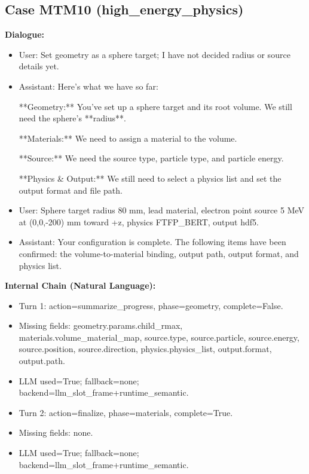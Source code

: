 \documentclass[11pt]{ctexart}
\begin{document}
\subsection{Case MTM10 (high\_energy\_physics)}
\textbf{Dialogue:}
\begin{itemize}
\item User: Set geometry as a sphere target; I have not decided radius or source details yet.
\item Assistant: Here's what we have so far:

**Geometry:** You've set up a sphere target and its root volume. We still need the sphere's **radius**.

**Materials:** We need to assign a material to the volume.

**Source:** We need the source type, particle type, and particle energy.

**Physics \& Output:** We still need to select a physics list and set the output format and file path.
\item User: Sphere target radius 80 mm, lead material, electron point source 5 MeV at (0,0,-200) mm toward +z, physics FTFP\_BERT, output hdf5.
\item Assistant: Your configuration is complete. The following items have been confirmed: the volume-to-material binding, output path, output format, and physics list.
\end{itemize}
\textbf{Internal Chain (Natural Language):}
\begin{itemize}
\item Turn 1: action=summarize\_progress, phase=geometry, complete=False.
\item Missing fields: geometry.params.child\_rmax, materials.volume\_material\_map, source.type, source.particle, source.energy, source.position, source.direction, physics.physics\_list, output.format, output.path.
\item LLM used=True; fallback=none; backend=llm\_slot\_frame+runtime\_semantic.
\item Turn 2: action=finalize, phase=materials, complete=True.
\item Missing fields: none.
\item LLM used=True; fallback=none; backend=llm\_slot\_frame+runtime\_semantic.
\end{itemize}
\end{document}
